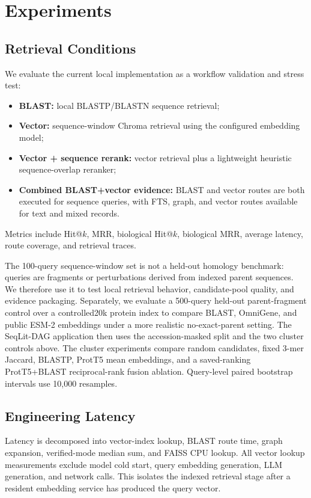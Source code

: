 \documentclass[11pt]{article}
\begin{document}
\section{Experiments}

\subsection{Retrieval Conditions}

We evaluate the current local implementation as a workflow validation and stress test:
\begin{itemize}
  \item \textbf{BLAST:} local BLASTP/BLASTN sequence retrieval;
  \item \textbf{Vector:} sequence-window Chroma retrieval using the configured embedding model;
  \item \textbf{Vector + sequence rerank:} vector retrieval plus a lightweight heuristic sequence-overlap reranker;
  \item \textbf{Combined BLAST+vector evidence:} BLAST and vector routes are both executed for sequence queries, with FTS, graph, and vector routes available for text and mixed records.
\end{itemize}
Metrics include Hit@$k$, MRR, biological Hit@$k$, biological MRR, average latency, route coverage, and retrieval traces.

The 100-query sequence-window set is not a held-out homology benchmark: queries are fragments or perturbations derived from indexed parent sequences. We therefore use it to test local retrieval behavior, candidate-pool quality, and evidence packaging. Separately, we evaluate a 500-query held-out parent-fragment control over a controlled20k protein index to compare BLAST, OmniGene, and public ESM-2 embeddings under a more realistic no-exact-parent setting. The SeqLit-DAG application then uses the accession-masked split and the two cluster controls above. The cluster experiments compare random candidates, fixed 3-mer Jaccard, BLASTP, ProtT5 mean embeddings, and a saved-ranking ProtT5+BLAST reciprocal-rank fusion ablation. Query-level paired bootstrap intervals use 10,000 resamples.

\subsection{Engineering Latency}

Latency is decomposed into vector-index lookup, BLAST route time, graph expansion, verified-mode median sum, and FAISS CPU lookup. All vector lookup measurements exclude model cold start, query embedding generation, LLM generation, and network calls. This isolates the indexed retrieval stage after a resident embedding service has produced the query vector.
\end{document}
